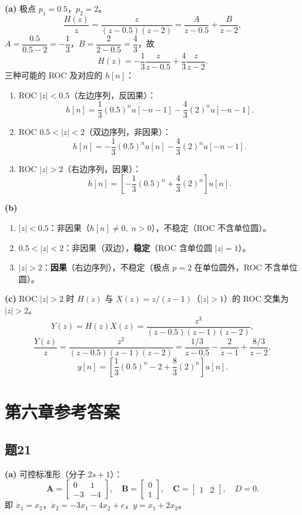 \documentclass[11pt,a4paper]{ctexart}
\begin{document}
\textbf{(a)} 极点 $p_1=0.5$，$p_2=2$。
\[
\frac{H(z)}{z}=\frac{z}{(z-0.5)(z-2)}=\frac{A}{z-0.5}+\frac{B}{z-2},
\]
$A=\dfrac{0.5}{0.5-2}=-\dfrac{1}{3}$，$B=\dfrac{2}{2-0.5}=\dfrac{4}{3}$，故
\[
H(z)=-\frac{1}{3}\frac{z}{z-0.5}+\frac{4}{3}\frac{z}{z-2}.
\]
三种可能的 ROC 及对应的 $h[n]$：
\begin{enumerate}[label=(\roman*)]
    \item ROC $|z|<0.5$（左边序列，反因果）：
    \[
    h[n]=\frac{1}{3}(0.5)^n u[-n-1]-\frac{4}{3}(2)^n u[-n-1].
    \]
    \item ROC $0.5<|z|<2$（双边序列，非因果）：
    \[
    h[n]=-\frac{1}{3}(0.5)^n u[n]-\frac{4}{3}(2)^n u[-n-1].
    \]
    \item ROC $|z|>2$（右边序列，因果）：
    \[
    h[n]=\left[-\frac{1}{3}(0.5)^n+\frac{4}{3}(2)^n\right]u[n].
    \]
\end{enumerate}

\textbf{(b)}
\begin{enumerate}[label=(\roman*)]
    \item $|z|<0.5$：非因果（$h[n]\neq 0,\;n>0$），不稳定（ROC 不含单位圆）。
    \item $0.5<|z|<2$：非因果（双边），\textbf{稳定}（ROC 含单位圆 $|z|=1$）。
    \item $|z|>2$：\textbf{因果}（右边序列），不稳定（极点 $p=2$ 在单位圆外，ROC 不含单位圆）。
\end{enumerate}

\textbf{(c)} ROC $|z|>2$ 时 $H(z)$ 与 $X(z)=z/(z-1)$（$|z|>1$）的 ROC 交集为 $|z|>2$。
\[
Y(z)=H(z)X(z)=\frac{z^3}{(z-0.5)(z-1)(z-2)},
\]
\[
\frac{Y(z)}{z}=\frac{z^2}{(z-0.5)(z-1)(z-2)}=\frac{1/3}{z-0.5}-\frac{2}{z-1}+\frac{8/3}{z-2},
\]
\[
y[n]=\left[\frac{1}{3}(0.5)^n-2+\frac{8}{3}(2)^n\right]u[n].
\]

\section{第六章参考答案}

\subsection*{题21}

\textbf{(a)} 可控标准形（分子 $2s+1$）：
\[
\mathbf{A}=\begin{bmatrix}0&1\\-3&-4\end{bmatrix},\quad
\mathbf{B}=\begin{bmatrix}0\\1\end{bmatrix},\quad
\mathbf{C}=\begin{bmatrix}1&2\end{bmatrix},\quad D=0.
\]
即 $\dot x_1=x_2$，$\dot x_2=-3x_1-4x_2+e$，$y=x_1+2x_2$。
\end{document}

